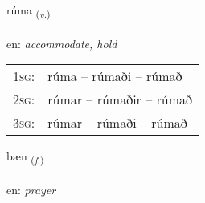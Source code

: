 \documentclass[frontgrid, backgrid]{flacards}\usepackage[]{graphicx}\usepackage[]{xcolor}
\begin{document}
\renewcommand{\flhead}{\vskip5pt \fboxsep=0pt {\small\bfseries\footnotesize Sagnorð | Verb}}
\renewcommand{\fcfoot}{\vskip5pt \fboxsep=0pt \hspace{2pt}{\small\bfseries\footnotesize 3K}}

\renewcommand{\blhead}{\vskip5pt {\small\bfseries\footnotesize Sagnorð | Verb }}
\renewcommand{\bcfoot}{\vskip5pt \hspace{2pt}{\small\bfseries\footnotesize 3K}}


{rúma \small{\textsubscript{(\textit{v.})}} \\[1ex] %
\textphonetic{[ruːma]} \\
en: \emph{accommodate, hold} \\  [2ex]
\renewcommand*{\arraystretch}{0.8}
\begin{tabular}{p{1cm}l}
\textsc{1sg}: & rúma -- rúmaði -- rúmað \\ 
\textsc{2sg}: & rúmar -- rúmaðir -- rúmað \\ 
\textsc{3sg}: & rúmar -- rúmaði -- rúmað \\ 
\end{tabular}
}

\renewcommand{\flhead}{\vskip5pt \fboxsep=0pt {\small\bfseries\footnotesize Nafnorð | Noun}}
\renewcommand{\fcfoot}{\vskip5pt \fboxsep=0pt \hspace{2pt}{\small\bfseries\footnotesize 3K}}

\renewcommand{\blhead}{\vskip5pt {\small\bfseries\footnotesize Nafnorð | Noun }}
\renewcommand{\bcfoot}{\vskip5pt \hspace{2pt}{\small\bfseries\footnotesize 3K}}


{bæn \small{\textsubscript{(\textit{f.})}} \\[1ex] %
\textphonetic{[paiːn]} \\
en: \emph{prayer} \\  [2ex]
\renewcommand*{\arraystretch}{0.8}
}
\end{document}
